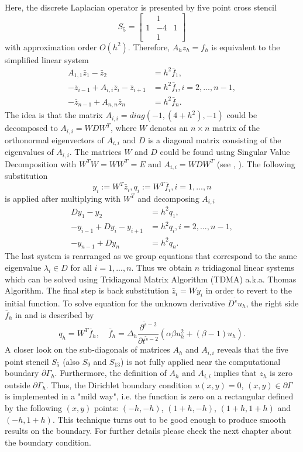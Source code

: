 \documentclass[11pt,a4paper,twoside]{article}
\begin{document}
Here, the discrete Laplacian operator is presented by five point cross stencil
\[
S_5 = 
\begin{bmatrix}
            &  1  &  \\
    1     &  -4    & 1\\
            &  1  &  
\end{bmatrix}
\]
with approximation order $O(h^2)$. Therefore, $A_h z_h = f_h$ is equivalent to the simplified linear system
\begin{align}
A_{1,1}\bar z_1 - \bar z_2 &= h^2\bar f_1, \nonumber \\
- \bar z_{i-1}  + A_{i,i}\bar z_i - \bar z_{i+1}  &= h^2\bar f_i, i = 2,...,n-1, \nonumber \\
- \bar z_{n-1} + A_{n,n}\bar z_n &= h^2\bar f_n.\label{LinSys}
\end{align}
The idea is that the matrix $A_{i,i} = diag(-1, (4+h^2), -1)$ could be decomposed to $A_{i,i}  = W D W^T$, where $W$ denotes an $n \times n$ matrix of the orthonormal eigenvectors of $A_{i,i} $ and $ D$ is a diagonal matrix consisting of the eigenvalues of $A_{i,i}$. The matrices $W$ and $D$ could be found using Singular Value Decomposition with $W^T W = W W^T = E$ and $A_{i,i} = WDW^T$ (see \cite{Tref}, \cite{FPS}). The following substitution 
\begin{equation}\label{subst}
y_i := W^T \bar z_i, q_i := W^T \bar f_i, i = 1, ...,n
\end{equation}
is applied after multiplying  with $W^T$ and decomposing $A_{i,i}$
\begin{align}
Dy_1 - y_2 &= h^2 q_1,\nonumber \\
-y_{i-1} + D y_i - y_{i+1} &= h^2 q_i, i = 2,...,n-1,\nonumber \\
- y_{n-1} + Dy_n &= h^2 q_n.\label{SubSys}
\end{align}
The last system  is rearranged as we group equations that correspond to the same eigenvalue $\lambda_i \in D$ for all $i = 1,...,n$. Thus we obtain $n$ tridiagonal linear systems which can be solved using Tridiagonal Matrix Algorithm (TDMA) a.k.a. Thomas Algorithm. The final step is back substitution $\bar z_i = W y_i$ in order to revert to the initial function. To solve equation  for the unknown derivative $D^{\tilde s}u_h$, the right side $\bar f_h$  in  and  is described by
$$
q_h = W^T \bar f_h, \quad \bar f_h = \Delta_h \frac{ \partial^{ \tilde s - 2 } } { \partial t^{ \tilde s - 2 } } ( \alpha \beta u_h^2  + (\beta -1)u_h).
$$
A closer look on the sub-diagonals of matrices $A_h$ and $A_{i,i}$ reveals that the five point stencil $S_5$ (also $S_9$ and $S_{13}$) is not fully applied near the computational boundary $\partial \Gamma_h$. Furthermore, the definition of $A_h$ and $A_{i,i}$ implies that $z_h$ is zero outside $ \partial \Gamma_h$. Thus, the Dirichlet boundary condition  $u(x,y) = 0$, $(x,y) \in \partial \Gamma$ is implemented in a "mild way", i.e. the function is zero on a rectangular defined by the following $(x,y)$ points: $(-h,-h)$, $(1+h,-h)$, $(1+h,1+h)$ and $(-h,1+h)$. This technique turns out to be good enough to produce smooth results on the boundary. For further details please check the next chapter  about the boundary condition.
\end{document}

